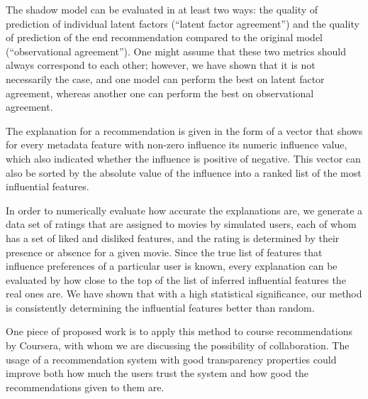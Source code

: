 The shadow model can be evaluated in at least two ways: the quality of
prediction of individual latent factors (``latent factor agreement'') and the
quality of prediction of the end recommendation compared to the original model
(``observational agreement''). One might assume that these two metrics should
always correspond to each other; however, we have shown that it is not
necessarily the case, and one model can perform the best on latent factor
agreement, whereas another one can perform the best on observational agreement.

The explanation for a recommendation is given in the form of a vector that shows
for every metadata feature with non-zero influence its numeric influence
value, which also indicated whether the influence is positive of negative. This
vector can also be sorted by the absolute value of the influence into a ranked
list of the most influential features.

In order to numerically evaluate how accurate the explanations are, we generate
a data set of ratings that are assigned to movies by simulated users, each of
whom has a set of liked and disliked features, and the rating is determined by
their presence or absence for a given movie. Since the true list of features
that influence preferences of a particular user is known, every explanation can
be evaluated by how close to the top of the list of inferred influential
features the real ones are. We have shown that with a high statistical
significance, our method is consistently determining the influential features
better than random.

One piece of proposed work is to apply this method to course recommendations by
Coursera, with whom we are discussing the possibility of collaboration. The
usage of a recommendation system with good transparency properties could improve
both how much the users trust the system and how good the recommendations
given to them are.

